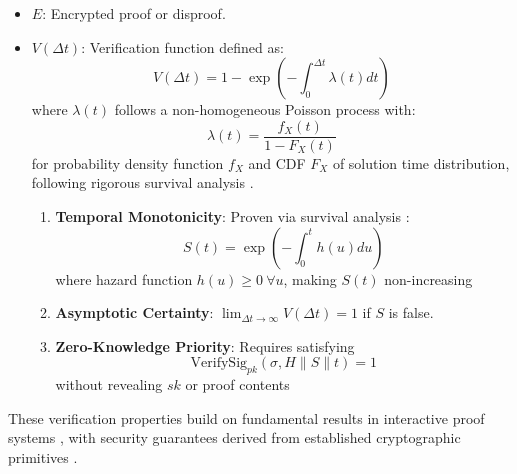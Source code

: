 \documentclass[12pt]{report}
\begin{document}
\begin{itemize}
    \item \( E \): Encrypted proof or disproof.
    \item \( V(\Delta t) \): Verification function defined as:
    \begin{equation*}
        V(\Delta t) = 1 - \exp\left(-\int_0^{\Delta t} \lambda(t) dt\right)
    \end{equation*}
    where \(\lambda(t)\) follows a non-homogeneous Poisson process with:
    \begin{equation*}
        \lambda(t) = \frac{f_X(t)}{1 - F_X(t)}
    \end{equation*}
    for probability density function \(f_X\) and CDF \(F_X\) of solution time distribution, following rigorous survival analysis \cite{AndersenBorgan1997}.
    \begin{enumerate}
        \item \textbf{Temporal Monotonicity}: Proven via survival analysis \cite{Kleinbaum2012}:
        \begin{equation*}
            S(t) = \exp\left(-\int_0^t h(u)du\right)
        \end{equation*}
        where hazard function \(h(u) \geq 0\ \forall u\), making \(S(t)\) non-increasing
        \item \textbf{Asymptotic Certainty}: \( \lim_{\Delta t \to \infty} V(\Delta t) = 1 \) if \( S \) is false.
        \item \textbf{Zero-Knowledge Priority}: Requires satisfying
        \begin{equation*}
            \text{VerifySig}_{pk}(\sigma, H \parallel S \parallel t) = 1
        \end{equation*}
        without revealing \(sk\) or proof contents
    \end{enumerate}
\end{itemize}

These verification properties build on fundamental results in interactive proof systems \cite{Shamir1992}, with security guarantees derived from established cryptographic primitives \cite{BlumEtAl1986,ChaumEtAl1988}.
\end{document}
